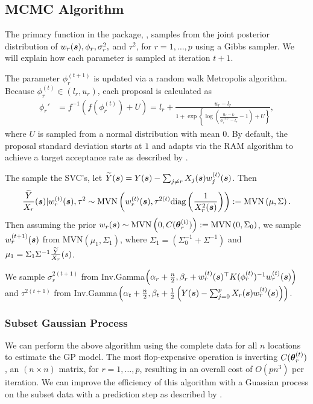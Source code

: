 \subsection{MCMC Algorithm}
\label{sec:mcmc}
The primary function in the  package, , samples from the joint posterior distribution of $w_r(\boldsymbol{s}), \phi_r, \sigma_r^2,$ and $\tau^2$, for $r = 1, \dots, p$ using a Gibbs sampler. We will explain how each parameter is sampled at iteration $t+1$.

The parameter $\phi_r^{(t+1)}$ is updated via a random walk Metropolis algorithm. Because $\phi_r^{(t)} \in (l_r, u_r)$, each proposal is calculated as 
\begin{align*}
    \phi_r' &= f^{-1}(f(\phi_r^{(t)}) + U) = l_r + \frac{u_r - l_r}{1 + \exp\left\{\log\left(\frac{u_r - l_r}{\phi_r^{(t)} - l_r} - 1\right) + U\right\}},
\end{align*}
where $U$ is sampled from a normal distribution with mean $0$. By default, the proposal standard deviation starts at $1$ and adapts via the RAM algorithm to achieve a target acceptance rate as described by \cite{vihola}.

The sample the SVC's, let $\widetilde{Y}(\boldsymbol{s}) = Y(\boldsymbol{s}) - \sum_{j\neq r} X_j(\boldsymbol{s})w_j^{(t)}(\boldsymbol{s})$. Then
\begin{align*}
    \frac{\widetilde{Y}}{X_r}(\boldsymbol{s}) | w_r^{(t)}(\boldsymbol{s}), \tau^2 \sim \text{MVN} \left(w_r^{(t)}(\boldsymbol{s}), \tau^{2(t)} \text{diag}\left( \frac{1}{X_r^2(\boldsymbol{s})} \right)\right) := \text{MVN} \left(\mu, \Sigma\right).
\end{align*}
Then assuming the prior $w_r(\boldsymbol{s}) \sim \text{MVN}\left(0, C(\boldsymbol{\theta}_r^{(t)})\right) := \text{MVN}\left(0, \Sigma_0\right)$, we sample $w_r^{(t+1)}(\boldsymbol{s})$ from MVN$(\mu_1, \Sigma_1)$, where $\Sigma_1 = \left(\Sigma_0^{-1} + \Sigma^{-1}\right)$ and $\mu_1 = \Sigma_1 \Sigma^{-1} \frac{\widetilde{Y}}{X_r}(s)$.

We sample $\sigma_r^{2(t+1)}$ from Inv.Gamma$\left(\alpha_r + \frac{n}{2}, \beta_r + w_r^{(t)}(\boldsymbol{s})^{\top} K(\phi_r^{(t)})^{-1} w_r^{(t)}(\boldsymbol{s})\right)$ and $\tau^{2(t+1)}$ from Inv.Gamma$\left(\alpha_t + \frac{n}{2}, \beta_t + \frac{1}{2} \left(Y(\boldsymbol{s}) - \sum_{j=0}^p X_r(\boldsymbol{s})w_r^{(t)}(\boldsymbol{s}) \right)\right)$.

\subsubsection{Subset Gaussian Process}
\label{sec:subset_GP}

We can perform the above algorithm using the complete data for all $n$ locations to estimate the GP model. The most flop-expensive operation is inverting $C(\boldsymbol{\theta}_r^{(t)})$, an $(n \times n)$ matrix, for $r = 1, \dots, p$, resulting in an overall cost of $O(pn^3)$ per iteration. We can improve the efficiency of this algorithm with a Guassian process on the subset data with a prediction step as described by \cite{banerjee}.


